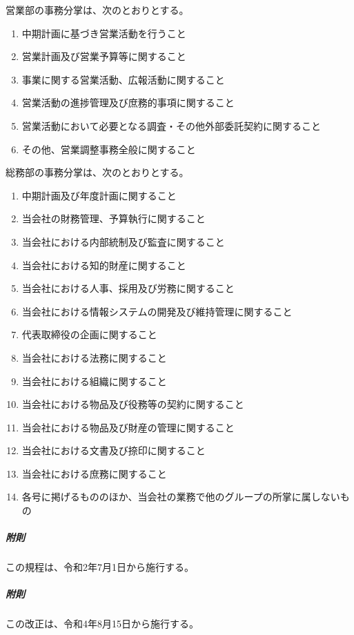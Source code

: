 \documentclass[10pt,a4paper,uplatex]{jsarticle}
\begin{document}
営業部の事務分掌は、次のとおりとする。
\begin{enumerate}
	\item 中期計画に基づき営業活動を行うこと
	\item 営業計画及び営業予算等に関すること
	\item 事業に関する営業活動、広報活動に関すること
	\item 営業活動の進捗管理及び庶務的事項に関すること
	\item 営業活動において必要となる調査・その他外部委託契約に関すること
	\item その他、営業調整事務全般に関すること
\end{enumerate}

総務部の事務分掌は、次のとおりとする。
\begin{enumerate}
	\item 中期計画及び年度計画に関すること
	\item 当会社の財務管理、予算執行に関すること
	\item 当会社における内部統制及び監査に関すること
	\item 当会社における知的財産に関すること
	\item 当会社における人事、採用及び労務に関すること
	\item 当会社における情報システムの開発及び維持管理に関すること
	\item 代表取締役の企画に関すること
	\item 当会社における法務に関すること
	\item 当会社における組織に関すること
	\item 当会社における物品及び役務等の契約に関すること
	\item 当会社における物品及び財産の管理に関すること
	\item 当会社における文書及び捺印に関すること
	\item 当会社における庶務に関すること
	\item 各号に掲げるもののほか、当会社の業務で他のグループの所掌に属しないもの
\end{enumerate}

\vspace{1cm}
\subparagraph{附則}
この規程は、令和2年7月1日から施行する。
\subparagraph{附則}
この改正は、令和4年8月15日から施行する。
\end{document}
